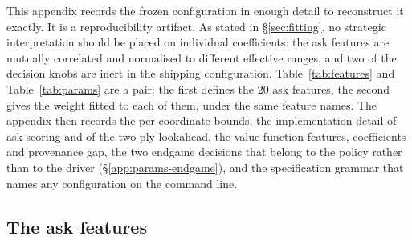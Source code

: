 \documentclass[11pt]{article}
\theoremstyle{definition}
\newcommand{\numAskFeats}{20}
\begin{document}
This appendix records the frozen configuration in enough detail to reconstruct it
exactly. It is a reproducibility artifact. As stated in \S\ref{sec:fitting}, no
strategic interpretation should be placed on individual coefficients: the ask
features are mutually correlated and normalised to different effective ranges, and
two of the decision knobs are inert in the shipping configuration.
Table~\ref{tab:features} and Table~\ref{tab:params} are a pair: the first defines
the \numAskFeats{} ask features, the second gives the weight fitted to each of
them, under the same feature names. The appendix then records the per-coordinate
bounds, the implementation detail of ask scoring and of the two-ply lookahead,
the value-function features, coefficients and provenance gap, the two
endgame decisions that belong to the policy rather than to the driver
(\S\ref{app:params-endgame}), and the specification grammar that names any
configuration on the command line.

\subsection{The ask features}
\end{document}
